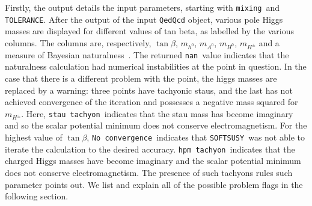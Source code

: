 \documentclass{article}
\def\SOFTSUSY{{\tt SOFTSUSY}}
\def\code#1{\small{\tt #1}\normalsize}
\begin{document}
Firstly, the output details the input parameters, starting with
\code{mixing}~and \code{TOLERANCE}.  
After the output of the input \code{QedQcd} object,
various pole Higgs masses are displayed for different values of tan beta, as
labelled by the various columns. The columns are, respectively, 
$\tan \beta$, $m_{h^0}$, $m_{A^0}$, $m_{H^0}$, $m_{H^\pm}$ and a measure of
Bayesian naturalness~\cite{1709.07895}. The returned \code{nan}\ value
indicates that the naturalness calculation had numerical instabilities at the
point in question. 
In the case that there is a different problem with the point, the higgs masses are
replaced by a warning: three points have tachyonic staus, and the last has
not achieved convergence of the iteration and possesses a negative mass
squared for $m_{H^\pm}$. Here, \code{stau tachyon}~indicates that the
stau mass has become imaginary and so the scalar potential minimum does not 
conserve electromagnetism. For the highest value of $\tan \beta$, \code{No
  convergence}~indicates that \SOFTSUSY~was not able to iterate the
calculation to the desired accuracy. \code{hpm tachyon}~indicates that the
charged Higgs masses have become imaginary and the scalar potential minimum
does not conserve electromagnetism. The presence of such tachyons rules such
parameter points out.  
We list and explain all of the possible problem flags in 
the following section.
\end{document}

